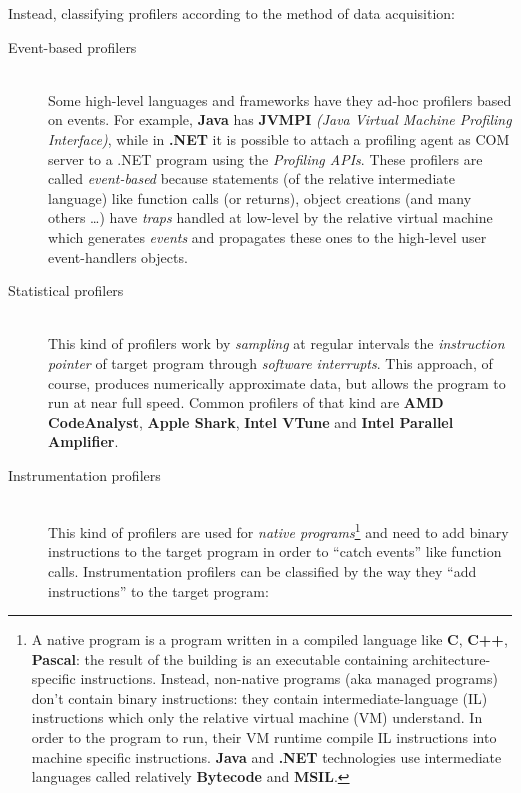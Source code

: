 \documentclass[a4paper,10pt]{report}
\begin{document}
\begin{flushleft}
Instead, classifying profilers according to the method of data acquisition:
\end{flushleft}


\begin{description}
\item[Event-based profilers] \hfill \\
Some high-level languages and frameworks have they ad-hoc profilers based on
events. For example, \textbf{Java} has \textbf{JVMPI} \textit{(Java Virtual
Machine Profiling Interface)}, while in \textbf{.NET} it is possible to attach a
profiling agent as COM server to a .NET program using the \emph{Profiling APIs}.
These profilers are called \emph{event-based} because statements (of the
relative intermediate language) like function calls (or returns), object
creations (and many others \ldots) have \emph{traps} handled at low-level by the
relative virtual machine which generates \emph{events} and propagates these ones
to the high-level user event-handlers objects.

\item[Statistical profilers] \hfill \\
This kind of profilers work by \emph{sampling} at regular intervals the
\emph{instruction pointer} of target program through \emph{software interrupts}.
This approach, of course, produces numerically approximate data, but allows the
program to run at near full speed. Common profilers of that kind are \textbf{AMD
CodeAnalyst}, \textbf{Apple Shark}, \textbf{Intel VTune} and \textbf{Intel
Parallel Amplifier}.

\item[Instrumentation profilers] \hfill \\
This kind of profilers are used for \emph{native programs}\footnote{A native
program is a program written in a compiled language like \textbf{C},
\textbf{C++}, \textbf{Pascal}: the result of the building is an executable
containing architecture-specific instructions. Instead, non-native programs (aka
managed programs) don't contain binary instructions: they contain
intermediate-language (IL) instructions which only the relative virtual machine
(VM) understand. In order to the program to run, their VM runtime compile IL
instructions into machine specific instructions. \textbf{Java} and \textbf{.NET}
technologies use intermediate languages called relatively \textbf{Bytecode} and
\textbf{MSIL}.} and need to add binary instructions to the target program in
order to ``catch events'' like function calls. Instrumentation profilers can be
classified by the way they ``add instructions'' to the target program:


\end{description}
\end{document}
